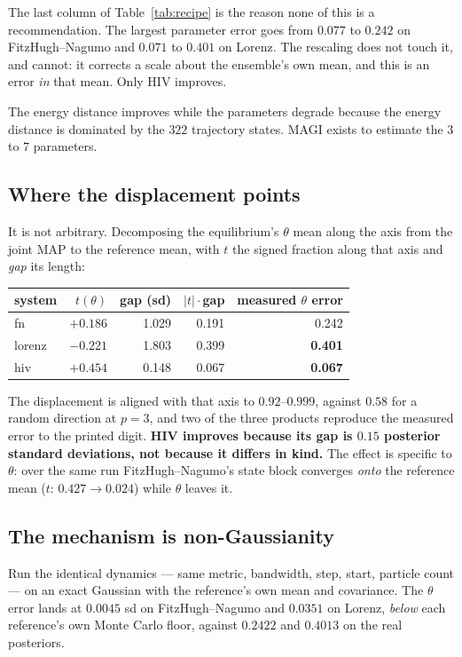 \documentclass[11pt]{article}
\theoremstyle{remark}
\begin{document}
The last column of Table~\ref{tab:recipe} is the reason none of this is a recommendation. The
largest parameter error goes from $0.077$ to $0.242$ on FitzHugh--Nagumo and $0.071$ to $0.401$ on
Lorenz. The rescaling does not touch it, and cannot: it corrects a scale about the ensemble's own
mean, and this is an error \emph{in} that mean. Only HIV improves.

The energy distance improves while the parameters degrade because the energy distance is dominated
by the $322$ trajectory states. MAGI exists to estimate the $3$ to $7$ parameters.

\subsection{Where the displacement points}

It is not arbitrary. Decomposing the equilibrium's $\theta$ mean along the axis from the joint MAP
to the reference mean, with $t$ the signed fraction along that axis and \emph{gap} its length:

\begin{center}\small
\begin{tabular}{lrrrr}
\toprule
system & $t(\theta)$ & gap (sd) & $|t|\cdot$gap & measured $\theta$ error\\
\midrule
fn     & $+0.186$ & 1.029 & 0.191 & 0.242\\
lorenz & $-0.221$ & 1.803 & 0.399 & \textbf{0.401}\\
hiv    & $+0.454$ & 0.148 & 0.067 & \textbf{0.067}\\
\bottomrule
\end{tabular}
\end{center}

The displacement is aligned with that axis to $0.92$--$0.999$, against $0.58$ for a random
direction at $p = 3$, and two of the three products reproduce the measured error to the printed
digit. \textbf{HIV improves because its gap is $0.15$ posterior standard deviations, not because it
differs in kind.} The effect is specific to $\theta$: over the same run FitzHugh--Nagumo's state
block converges \emph{onto} the reference mean ($t$: $0.427 \to 0.024$) while $\theta$ leaves it.

\subsection{The mechanism is non-Gaussianity}

Run the identical dynamics --- same metric, bandwidth, step, start, particle count --- on an exact
Gaussian with the reference's own mean and covariance. The $\theta$ error lands at $0.0045$ sd on
FitzHugh--Nagumo and $0.0351$ on Lorenz, \emph{below} each reference's own Monte Carlo floor,
against $0.2422$ and $0.4013$ on the real posteriors.
\end{document}
